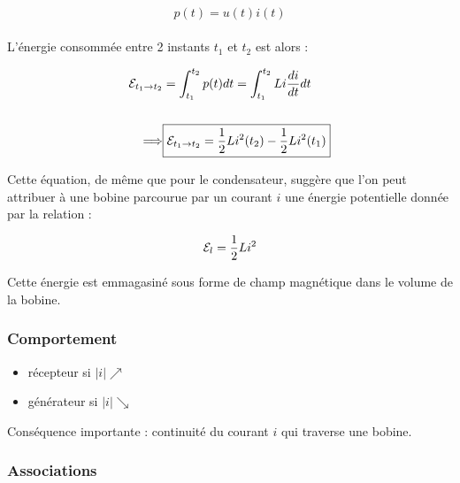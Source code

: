 \documentclass{article}
\begin{document}
\begin{align*}\begin{split}
p(t)=u(t)i(t)
\end{split}\end{align*}

\bigskip

L'énergie consommée entre 2 instants $t_1$ et $t_2$ est alors :

\bigskip

\begin{align*}\begin{split}
\mathcal{E}_{t_1\rightarrow t_2}&=\int_{t_1}^{t_2}p(t)dt = \int_{t_1}^{t_2}Li\frac{di}{dt}dt\\\\
\Longrightarrow& \boxed{\mathcal{E}_{t_1\rightarrow t_2} = \frac{1}{2}Li^2(t_2)-\frac{1}{2}Li^2(t_1)}
\end{split}\end{align*}

Cette équation, de même que pour le condensateur, suggère que l'on peut attribuer à une bobine parcourue par un courant $i$ une énergie potentielle donnée par la relation :

\begin{align*}\begin{split}
\mathcal{E}_l=\frac{1}{2}Li^2
\end{split}\end{align*}

Cette énergie est emmagasiné sous forme de champ magnétique dans le volume de la bobine.

\subsubsection*{Comportement}

\begin{itemize}
    \item récepteur si $|i|\nearrow$
    \item générateur si $|i|\searrow$
\end{itemize}

Conséquence importante : continuité du courant $i$ qui traverse une bobine.


\subsubsection*{Associations}
\end{document}
